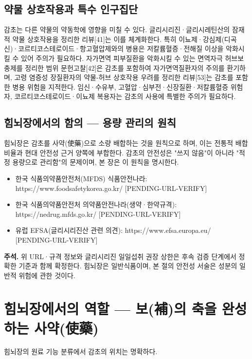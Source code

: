 \documentclass[11pt,oneside]{book}
\newenvironment{authnote}
  {\par\smallskip\begingroup\leftskip=7mm\rightskip=5mm\small\color{muted}\noindent\ignorespaces}
  {\par\endgroup\smallskip}
\begin{document}
\subsection{약물 상호작용과 특수 인구집단}
감초는 다른 약물의 약동학에 영향을 미칠 수 있다. 글리시리진·글리시레틴산의 잠재적 약물 상호작용을 정리한 리뷰[41]는 이를 체계화한다. 특히 이뇨제·강심제(디곡신)·코르티코스테로이드·항고혈압제와의 병용은 저칼륨혈증·전해질 이상을 악화시킬 수 있어 주의가 필요하다. 자가면역 피부질환을 악화시킬 수 있는 면역자극 허브보충제를 정리한 범위 문헌고찰[42]은 감초를 포함하여 자가면역질환자의 주의를 환기하며, 고령 염증성 장질환자의 약물-허브 상호작용 우려를 정리한 리뷰[53]는 감초를 포함한 병용 위험을 지적한다. 임신·수유부, 고혈압·심부전·신장질환·저칼륨혈증 위험자, 코르티코스테로이드·이뇨제 복용자는 감초의 사용에 특별한 주의가 필요하다.

\subsection{힘뇌장에서의 함의 — 용량 관리의 원칙}
힘뇌장은 감초를 사약(使藥)으로 소량 배합하는 것을 원칙으로 하며, 이는 전통적 배합 비율과 현대 안전성 근거 양쪽에 부합한다. 감초의 안전성은 "쓰지 않음"이 아니라 "적정 용량으로 관리함"의 문제이며, 본 장은 이 원칙을 명시한다.

\begin{itemize}[leftmargin=6mm,itemsep=1pt,topsep=2pt]
  \item 한국 식품의약품안전처(MFDS) 식품안전나라: https://www.foodsafetykorea.go.kr/ [PENDING-URL-VERIFY]
  \item 한국 식품의약품안전처 의약품안전나라(생약·한약규격): https://nedrug.mfds.go.kr/ [PENDING-URL-VERIFY]
  \item 유럽 EFSA(글리시리진산 관련 의견): https://www.efsa.europa.eu/ [PENDING-URL-VERIFY]
\end{itemize}
\begin{authnote}\textbf{주석.} 위 URL·규격 정보와 글리시리진 일일섭취 권장 상한은 후속 검증 단계에서 정확한 기준과 함께 확정한다. 힘뇌장은 일반식품이며, 본 절의 안전성 서술은 성분의 일반적 위험에 관한 것이다.\end{authnote}
\section{힘뇌장에서의 역할 — 보(補)의 축을 완성하는 사약(使藥)}
힘뇌장의 원료 기능 분류에서 감초의 위치는 명확하다.
\end{document}
